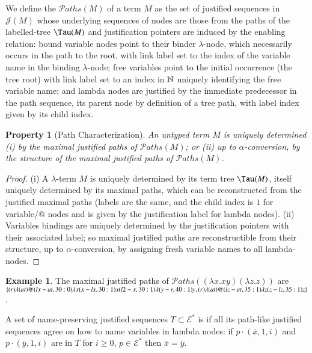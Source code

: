 \documentclass{elsarticle}
\theoremstyle{plain}
\newtheorem{property}[theorem]{Property}
\theoremstyle{definition}
\newtheorem{example}{Example}[section]
\def\nameencoding{\mathcal{E}} %
\newcommand{\ctree}{\Tau} %
\newcommand\pathset{{\mathcal{P}aths}} %
\def\justseqset{\mathcal{J}}
\begin{document}
We define the  $\pathset(M)$ of a term $M$ as the set of justified sequences in $\justseqset(M)$
whose underlying sequences of nodes are those from the paths of the labelled-tree $\ctree(M)$ and justification pointers are induced by the enabling relation:
 bound variable nodes point to their binder $\lambda$-node, which necessarily occurs in the path to the root, with link label set to the index of the variable name in the binding $\lambda$-node;
 free variables point to the initial occurrence (the tree root) with link label  set to an index in $\mathbb{N}$ uniquely identifying the
 free variable name;
 and lambda nodes are justified by the immediate predecessor in the path sequence, its parent node by definition of a tree path, with label index given by its child index.
\begin{property}[Path Characterization]
\label{prop:tree_path_charact}
 An untyped term $M$ is uniquely determined
(i) by the maximal justified paths of $\pathset(M)$;
or (ii) up to $\alpha$-conversion, by the \emph{structure} of the maximal justified paths of $\pathset(M)$.
\end{property}
\begin{proof}
(i) A $\lambda$-term $M$ is uniquely determined by its term tree $\ctree(M)$, itself uniquely determined by its maximal paths, which can be reconstructed from the justified maximal paths (labels are the same, and the child index is $1$ for variable/@ nodes and is given by the justification label for lambda nodes).
%
(ii) Variables bindings are uniquely determined by the justification pointers with their associated label; so maximal justified paths are  reconstructible from their structure, up to $\alpha$-conversion, by assigning fresh variable names to all lambda-nodes.
\end{proof}

\begin{example}
    The maximal justified paths of
  $\pathset((\lambda x.x y) (\lambda z.z))$
  are
  $\{
  \Pstr{ (r){\lambda} (at){@} (lx-at,30:0){\lambda x} (x-lx,30:1){x} (l2-x,30:1){\lambda} (y-r,40:1){y} },
  \Pstr{ (r){\lambda} (at){@} (lz-at,35:1){\lambda z} (z-lz,35:1){z}}
  \}$.
\end{example}

A set of name-preserving justified sequences $T\subset \nameencoding^*$ is  if all its path-like justified sequences agree on how to name variables in lambda nodes: if $p \cdot (\overline{x}, 1, i)$ and $p \cdot (\overline{y}, 1, i)$ are in $T$ for $i\geq 0$, $p\in \nameencoding^*$ then $\overline{x} = \overline{y}$.
\end{document}
